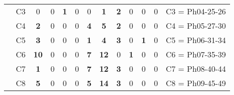 \begin{table}[H]
{\begin{tabular}{|ccccccccccccc|}
\multicolumn{1}{|c|}{}                                      & \multicolumn{1}{c|}{C3} & \multicolumn{1}{c|}{0}  & \multicolumn{1}{c|}{0}  & \multicolumn{1}{c|}{\textbf{1}}  & \multicolumn{1}{c|}{0}  & \multicolumn{1}{c|}{0}  & \multicolumn{1}{c|}{\textbf{1}}  & \multicolumn{1}{c|}{\textbf{2}}  & \multicolumn{1}{c|}{0}  & \multicolumn{1}{c|}{0}  & \multicolumn{1}{c|}{0}  & C3 = Ph04-25-26   \\ \cline{2-13}
\multicolumn{1}{|c|}{}                                      & \multicolumn{1}{c|}{C4} & \multicolumn{1}{c|}{\textbf{2}}  & \multicolumn{1}{c|}{0}  & \multicolumn{1}{c|}{0}  & \multicolumn{1}{c|}{0}  & \multicolumn{1}{c|}{\textbf{4}}  & \multicolumn{1}{c|}{\textbf{5}}  & \multicolumn{1}{c|}{\textbf{2}}  & \multicolumn{1}{c|}{0}  & \multicolumn{1}{c|}{0}  & \multicolumn{1}{c|}{0}  & C4 = Ph05-27-30   \\ \cline{2-13}
\multicolumn{1}{|c|}{}                                      & \multicolumn{1}{c|}{C5} & \multicolumn{1}{c|}{\textbf{3}}  & \multicolumn{1}{c|}{0}  & \multicolumn{1}{c|}{0}  & \multicolumn{1}{c|}{0}  & \multicolumn{1}{c|}{\textbf{1}}  & \multicolumn{1}{c|}{\textbf{4}}  & \multicolumn{1}{c|}{\textbf{3}}  & \multicolumn{1}{c|}{0}  & \multicolumn{1}{c|}{\textbf{1}}  & \multicolumn{1}{c|}{0}  & C5 = Ph06-31-34   \\ \cline{2-13}
\multicolumn{1}{|c|}{}                                      & \multicolumn{1}{c|}{C6} & \multicolumn{1}{c|}{\textbf{10}} & \multicolumn{1}{c|}{0}  & \multicolumn{1}{c|}{0}  & \multicolumn{1}{c|}{0}  & \multicolumn{1}{c|}{\textbf{7}}  & \multicolumn{1}{c|}{\textbf{12}} & \multicolumn{1}{c|}{0}  & \multicolumn{1}{c|}{\textbf{1}}  & \multicolumn{1}{c|}{0}  & \multicolumn{1}{c|}{0}  & C6 = Ph07-35-39   \\ \cline{2-13}
\multicolumn{1}{|c|}{}                                      & \multicolumn{1}{c|}{C7} & \multicolumn{1}{c|}{\textbf{1}}  & \multicolumn{1}{c|}{0}  & \multicolumn{1}{c|}{0}  & \multicolumn{1}{c|}{0}  & \multicolumn{1}{c|}{\textbf{7}}  & \multicolumn{1}{c|}{\textbf{12}} & \multicolumn{1}{c|}{\textbf{3}}  & \multicolumn{1}{c|}{0}  & \multicolumn{1}{c|}{0}  & \multicolumn{1}{c|}{0}  & C7 = Ph08-40-44   \\ \cline{2-13}
\multicolumn{1}{|c|}{}                                      & \multicolumn{1}{c|}{C8} & \multicolumn{1}{c|}{\textbf{5}}  & \multicolumn{1}{c|}{0}  & \multicolumn{1}{c|}{0}  & \multicolumn{1}{c|}{0}  & \multicolumn{1}{c|}{\textbf{5}}  & \multicolumn{1}{c|}{\textbf{14}} & \multicolumn{1}{c|}{\textbf{3}}  & \multicolumn{1}{c|}{0}  & \multicolumn{1}{c|}{0}  & \multicolumn{1}{c|}{0}  & C8 = Ph09-45-49   \\ \cline{2-13}

\end{tabular}}
\end{table}
